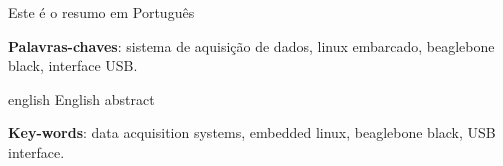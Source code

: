 \setlength{\absparsep}{18pt} %
\begin{resumo}
	Este é o resumo em Português
	
	\textbf{Palavras-chaves}: sistema de aquisição de dados, linux embarcado, beaglebone black, interface USB.
\end{resumo}

\begin{resumo}[Abstract]
	\begin{otherlanguage*}{english}
		English abstract
		\vspace{\onelineskip}
		
		\noindent 
		\textbf{Key-words}: data acquisition systems, embedded linux, beaglebone black, USB interface.
	\end{otherlanguage*}
\end{resumo}